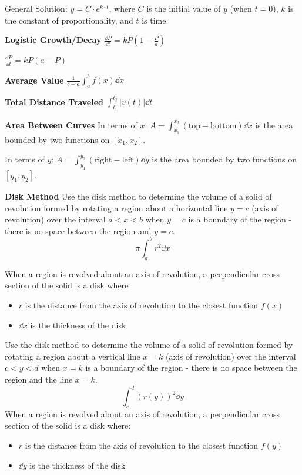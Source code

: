 \documentclass[10pt,a4paper,oneside]{book}
\begin{document}
General Solution: $y=C\cdot e^{k\cdot t}$, where $C$ is the initial value of $y$ (when $t=0$), $k$ is the constant of proportionality, and $t$ is time.

\textbf{Logistic Growth/Decay}
$\frac{\dd P}{\dd t}=kP\left(1-\frac{P}{a}\right)$

$\frac{\dd P}{\dd t}=kP(a-P)$

\textbf{Average Value}
$\frac{1}{b-a}\int_a^b f(x)\dd x$

\textbf{Total Distance Traveled}
$\int_{t_1}^{t_2}|v(t)|\dd t$

\textbf{Area Between Curves}
In terms of $x$: $A=\int_{x_1}^{x_2}(\text{top}-\text{bottom})\dd x$ is the area bounded by two functions on $[x_1,x_2]$.

In terms of $y$: $A=\int_{y_1}^{y_2}(\text{right}-\text{left})\dd y$ is the area bounded by two functions on $[y_1,y_2]$.

\textbf{Disk Method}
Use the disk method to determine the volume of a solid of revolution formed by rotating a region about a horizontal line $y=c$ (axis of revolution) over the interval 
$a<x<b$ when $y=c$ is a boundary of the region - there is no space between the region and $y=c$.
\[ \pi \int_a^b r^2 \dd x\]

When a region is revolved about an axis of revolution, a perpendicular cross section of the solid is a disk where 
\begin{itemize}
    \item $r$ is the distance from the axis of revolution to the closest function $f(x)$
    \item $\dd x$ is the thickness of the disk 
\end{itemize}

Use the disk method to determine the volume of a solid of revolution formed by rotating a region about a vertical line $x=k$ (axis of revolution) over the interval 
$c<y<d$ when $x=k$ is a boundary of the region - there is no space between the region and the line $x=k$.
\[ \int_c^d (r(y))^2 \dd y \]
When a region is revolved about an axis of revolution, a perpendicular cross section of the solid is a disk where:
\begin{itemize}
    \item $r$ is the distance from the axis of revolution to the closest function $f(y)$
    \item $\dd y$ is the thickness of the disk 
\end{itemize}
\end{document}
